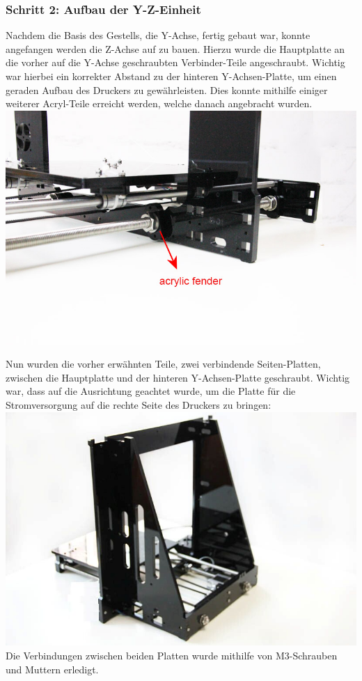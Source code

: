 \subsubsection{Schritt 2: Aufbau der Y-Z-Einheit}
Nachdem die Basis des Gestells, die Y-Achse, fertig gebaut war, konnte angefangen werden die Z-Achse auf zu bauen. Hierzu wurde die Hauptplatte an die vorher auf die Y-Achse geschraubten Verbinder-Teile angeschraubt. Wichtig war hierbei ein korrekter Abstand zu der hinteren Y-Achsen-Platte, um einen geraden Aufbau des Druckers zu gewährleisten. Dies konnte mithilfe einiger weiterer Acryl-Teile erreicht werden, welche danach angebracht wurden.\\
\includegraphics[clip=true, trim= 0 0 0 0, angle=0, width=\textwidth]{Bilder/Z_Assembly_1.jpg}

Nun wurden die vorher erwähnten Teile, zwei verbindende Seiten-Platten, zwischen die Hauptplatte und der hinteren Y-Achsen-Platte geschraubt. Wichtig war, dass auf die Ausrichtung geachtet wurde, um die Platte für die Stromversorgung auf die rechte Seite des Druckers zu bringen:\\
\includegraphics[width=\textwidth]{Bilder/Z_Assembly_2.jpg}
Die Verbindungen zwischen beiden Platten wurde mithilfe von M3-Schrauben und Muttern erledigt.

